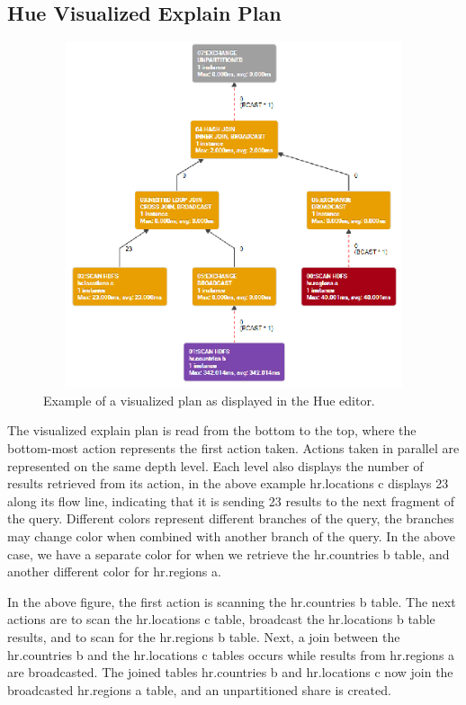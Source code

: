 \documentclass[onecolumn, draftclsnofoot,10pt, compsoc]{IEEEtran}
\begin{document}
\subsection{Hue Visualized Explain Plan}


\begin{figure}[ht]
    \begin{center}
    \includegraphics[width=6in, height=4in, keepaspectratio]{ExplainPlan.eps}
    \caption{Example of a visualized plan as displayed in the Hue editor.}
    \end{center}
\end{figure}


The visualized explain plan is read from the bottom to the top, where the bottom-most action represents the first action taken. Actions taken in parallel are represented on the same depth level. Each level also displays the number of results retrieved from its action, in the above example hr.locations c displays 23 along its flow line, indicating that it is sending 23 results to the next fragment of the query. Different colors represent different branches of the query, the branches may change color when combined with another branch of the query. In the above case, we have a separate color for when we retrieve the hr.countries b table, and another different color for hr.regions a. 

In the above figure, the first action is scanning the hr.countries b table. The next actions are to scan the hr.locations c table, broadcast the hr.locations b table results, and to scan for the hr.regions b table. Next, a join between the hr.countries b and the hr.locations c tables occurs while results from hr.regions a are broadcasted. The joined tables hr.countries b and hr.locations c now join the broadcasted hr.regions a table, and an unpartitioned share is created. 
\end{document}
